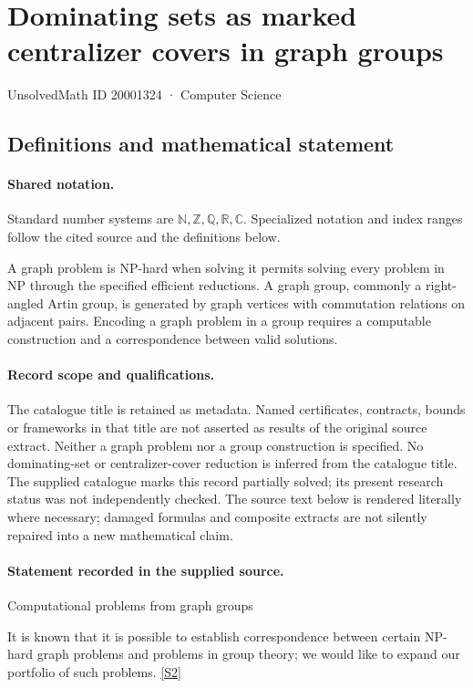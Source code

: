 \documentclass[11pt]{article}
\newcommand{\sref}[2]{\hyperlink{source:#1:#2}{[S#2]}}
\begin{document}
\setcounter{section}{20001323}
\section{Dominating sets as marked centralizer covers in graph groups}\label{20001324}
{\small\sffamily UnsolvedMath ID 20001324 · Computer Science}
\subsection{Definitions and mathematical statement}

\paragraph{Shared notation.}Standard number systems are $\mathbb N,\mathbb Z,\mathbb Q,\mathbb R,\mathbb C$. Specialized notation and index ranges follow the cited source and the definitions below.


A graph problem is NP-hard when solving it permits solving every problem in NP through the specified efficient reductions. A graph group, commonly a right-angled Artin group, is generated by graph vertices with commutation relations on adjacent pairs. Encoding a graph problem in a group requires a computable construction and a correspondence between valid solutions.
\paragraph{Record scope and qualifications.}
The catalogue title is retained as metadata. Named certificates, contracts, bounds or frameworks in that title are not asserted as results of the original source extract.
Neither a graph problem nor a group construction is specified. No dominating-set or centralizer-cover reduction is inferred from the catalogue title. The supplied catalogue marks this record partially solved; its present research status was not independently checked.
The source text below is rendered literally where necessary; damaged formulas and composite extracts are not silently repaired into a new mathematical claim.
\paragraph{Statement recorded in the supplied source.}
Computational problems from graph groups

It is known that it is possible to establish correspondence between certain NP-hard graph problems and problems in group theory; we would like to expand our portfolio of such problems. \sref{20001324}{2}
\end{document}
